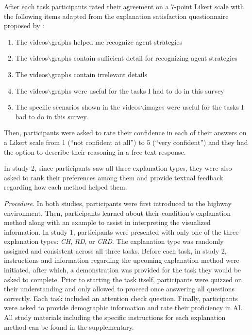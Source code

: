 \documentclass{ecai}
\begin{document}
After each task participants rated their agreement on a 7-point Likert scale with the following items adapted from the explanation satisfaction questionnaire proposed by \cite{hoffman2018metrics}:
\begin{enumerate}
\item The videos$\backslash$graphs helped me recognize agent strategies
\item The videos$\backslash$graphs contain sufficient detail for recognizing agent strategies
\item The videos$\backslash$graphs contain irrelevant details 
\item The videos$\backslash$graphs were useful for the tasks I had to do in this survey
\item The specific scenarios shown in the videos$\backslash$images were useful for the tasks I had to do in this survey.
\end{enumerate}
Then, participants were asked to rate their confidence in each of their answers on a Likert scale from 1 (``not confident at all'') to 5 (``very confident'') and they had the option to describe their reasoning in a free-text response.

In study 2, since participants saw all three explanation types, they were also asked to rank their preferences among them and provide textual feedback regarding how each method helped them.

\emph{Procedure.} In both studies, participants were first introduced to the highway environment. Then, participants learned about their condition's explanation method along with an example to assist in interpreting the visualized information. In study 1, participants were presented with only one of the three explanation types: \textit{CH}, \textit{RD}, or \textit{CRD}. The explanation type was randomly assigned and  consistent across all three tasks.
Before each task, in study 2, instructions and information regarding the upcoming explanation method were initiated, after which, a demonstration was provided for the task they would be asked to complete.
Prior to starting the task itself, participants were quizzed on their understanding and only allowed to proceed once answering all questions correctly. Each task included an attention check question. Finally, participants were asked to provide demographic information and rate their proficiency in AI.
All study materials including the specific instructions for each explanation method can be found in the supplementary.
\end{document}
